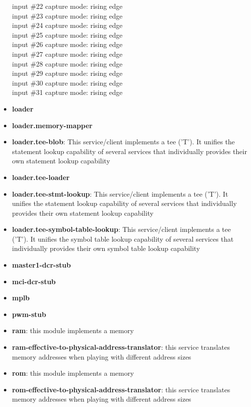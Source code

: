 \begin{itemize}
input \#22 capture mode: rising edge\\
input \#23 capture mode: rising edge\\
input \#24 capture mode: rising edge\\
input \#25 capture mode: rising edge\\
input \#26 capture mode: rising edge\\
input \#27 capture mode: rising edge\\
input \#28 capture mode: rising edge\\
input \#29 capture mode: rising edge\\
input \#30 capture mode: rising edge\\
input \#31 capture mode: rising edge\\

\item \textbf{loader}
\item \textbf{loader.memory-mapper}
\item \textbf{loader.tee-blob}: This service/client implements a tee ('T'). It unifies the statement lookup capability of several services that individually provides their own statement lookup capability
\item \textbf{loader.tee-loader}
\item \textbf{loader.tee-stmt-lookup}: This service/client implements a tee ('T'). It unifies the statement lookup capability of several services that individually provides their own statement lookup capability
\item \textbf{loader.tee-symbol-table-lookup}: This service/client implements a tee ('T'). It unifies the symbol table lookup capability of several services that individually provides their own symbol table lookup capability
\item \textbf{master1-dcr-stub}
\item \textbf{mci-dcr-stub}
\item \textbf{mplb}
\item \textbf{pwm-stub}
\item \textbf{ram}: this module implements a memory
\item \textbf{ram-effective-to-physical-address-translator}: this service translates memory addresses when playing with different address sizes
\item \textbf{rom}: this module implements a memory
\item \textbf{rom-effective-to-physical-address-translator}: this service translates memory addresses when playing with different address sizes

\end{itemize}
